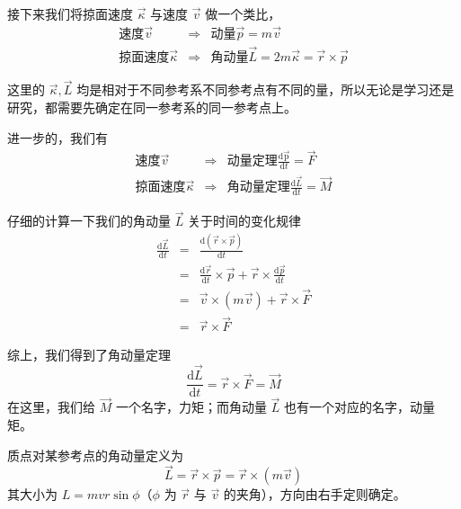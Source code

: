 接下来我们将掠面速度 $\vec{\kappa}$ 与速度 $\vec{v}$ 做一个类比，
\begin{eqnarray*}
    \text{速度} \vec{v} &\Longrightarrow&  \text{动量} \vec{p} = m\vec{v} \\
    \text{掠面速度} \vec{\kappa} &\Longrightarrow&  \text{角动量} \vec{L} = 2m\vec{\kappa}  = \vec{r} \times \vec{p}
\end{eqnarray*}

\begin{remark}
    这里的 $\vec{\kappa},\vec{L}$ 均是相对于不同参考系不同参考点有不同的量，所以无论是学习还是研究，都需要先确定在同一参考系的同一参考点上。
\end{remark}

进一步的，我们有
\begin{eqnarray*}
    \text{速度} \vec{v} &\Longrightarrow&  \text{动量定理} \frac{\mathrm{d\vec{p}}}{\mathrm{d}t} = \vec{F} \\
    \text{掠面速度} \vec{\kappa} &\Longrightarrow&  \text{角动量定理} \frac{\mathrm{d}\vec{L}}{\mathrm{d}t} = \vec{M} 
\end{eqnarray*}

仔细的计算一下我们的角动量 $\vec{L}$ 关于时间的变化规律
\begin{eqnarray*}
     \frac{\mathrm{d}\vec{L}}{\mathrm{d}t}&=& \frac{\mathrm{d} \left(\vec{r} \times \vec{p}\right)}{\mathrm{d}t} \\
     &=& \frac{\mathrm{d}\vec{r}}{\mathrm{d}t} \times \vec{p} + \vec{r} \times \frac{\mathrm{d}\vec{p}}{\mathrm{d}t} \\
     &=& \vec{v} \times \left(m\vec{v}\right) + \vec{r} \times \vec{F} \\
     &=& \vec{r} \times \vec{F}
\end{eqnarray*}

综上，我们得到了角动量定理
\begin{equation}
    \frac{\mathrm{d}\vec{L}}{\mathrm{d}t} = \vec{r} \times \vec{F} = \vec{M}
\end{equation}
在这里，我们给 $\vec{M}$ 一个名字，力矩；而角动量 $\vec{L}$ 也有一个对应的名字，动量矩。

\begin{definition}
    质点对某参考点的角动量定义为
    \begin{equation}
        \vec{L} = \vec{r} \times \vec{p} = \vec{r} \times (m\vec{v})
    \end{equation}
    其大小为 $L = mvr\sin\phi$（$\phi$ 为 $\vec{r}$ 与 $\vec{v}$ 的夹角），方向由右手定则确定。
\end{definition}

